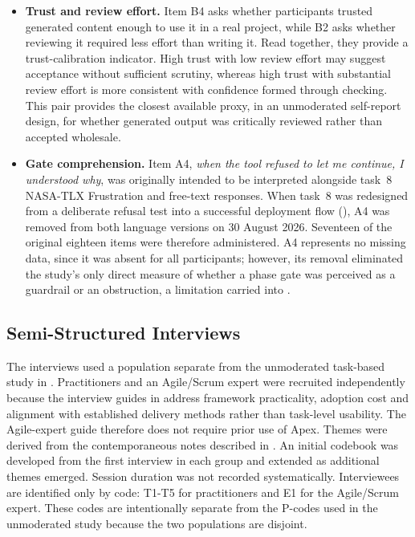 \begin{itemize}[leftmargin=0.6cm, itemsep=0.3em, topsep=0.2em]

\item \textbf{Trust and review effort.} Item B4 asks whether participants trusted generated content enough to use it in a real project, while B2 asks whether reviewing it required less effort than writing it. Read together, they provide a trust-calibration indicator. High trust with low review effort may suggest acceptance without sufficient scrutiny, whereas high trust with substantial review effort is more consistent with confidence formed through checking. This pair provides the closest available proxy, in an unmoderated self-report design, for whether generated output was critically reviewed rather than accepted wholesale.

\item \textbf{Gate comprehension.} Item A4, \emph{when the tool refused to let me continue, I understood why}, was originally intended to be interpreted alongside task~8 \ac{NASA-TLX} Frustration and free-text responses. When task~8 was redesigned from a deliberate refusal test into a successful deployment flow (), A4 was removed from both language versions on 30 August 2026. Seventeen of the original eighteen items were therefore administered. A4 represents no missing data, since it was absent for all participants; however, its removal eliminated the study's only direct measure of whether a phase gate was perceived as a guardrail or an obstruction, a limitation carried into .

\end{itemize}

\subsection{Semi-Structured Interviews}
\label{sec:interviews}

The interviews used a population separate from the unmoderated task-based study in . Practitioners and an Agile/Scrum expert were recruited independently because the interview guides in  address framework practicality, adoption cost and alignment with established delivery methods rather than task-level usability. The Agile-expert guide therefore does not require prior use of Apex. Themes were derived from the contemporaneous notes described in . An initial codebook was developed from the first interview in each group and extended as additional themes emerged. Session duration was not recorded systematically. Interviewees are identified only by code: T1-T5 for practitioners and E1 for the Agile/Scrum expert. These codes are intentionally separate from the P-codes used in the unmoderated study because the two populations are disjoint.

